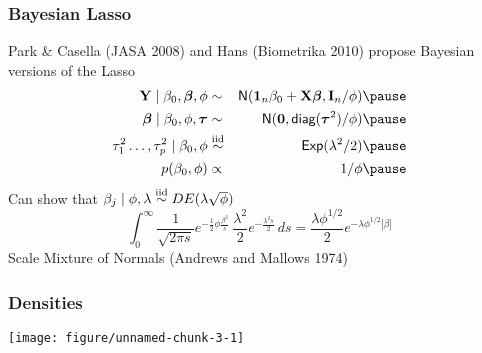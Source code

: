 \documentclass[handout]{beamer}\usepackage[]{graphicx}\usepackage[]{color}
\makeatletter
\def\maxwidth{ %
  \ifdim\Gin@nat@width>\linewidth
    \linewidth
  \else
    \Gin@nat@width
  \fi
}
\newenvironment{knitrout}{}{} %
\makeatother
\begin{document}
\begin{frame}
  \frametitle{Bayesian Lasso}
  Park \& Casella (JASA 2008) and Hans (Biometrika 2010) propose
  Bayesian versions of the Lasso  \pause
  \begin{eqnarray*}
    \Y \mid \beta_0, \b, \phi & \sim & \N(\one_n \beta_0 + \X \b, \I_n/\phi)  \pause\\
    \b \mid \beta_0, \phi, \taub & \sim & \N(\zero, \diag(\taub^2)/\phi)  \pause\\
    \tau_1^2 \ldots, \tau_p^2 \mid \beta_0, \phi & \simiid & \Ex(\lambda^2/2)  \pause\\
    p(\beta_0, \phi) & \propto& 1/\phi  \pause\\
  \end{eqnarray*}
Can show that $\beta_j \mid \phi, \lambda \mathrel{\mathop{\sim}\limits^{\rm iid}} DE(\lambda \sqrt{\phi})$
$$\int_0^\infty \frac{1}{\sqrt{2 \pi s}}
  e^{-\frac{1}{2} \phi \frac{\beta^2}{s }}
  \, \frac{\lambda^2}{2} e^{- \frac{\lambda^2 s}{2}}\, ds =
  \frac{\lambda \phi^{1/2}}{2} e^{-\lambda \phi^{1/2} |\beta|}
$$  \pause
Scale Mixture of Normals  (Andrews and Mallows 1974)
\end{frame}

\begin{frame}\frametitle{Densities}
\begin{knitrout}
\color{fgcolor}

{\centering \texttt{[image: figure/unnamed-chunk-3-1]} 

}



\end{knitrout}

\end{frame}
\end{document}
